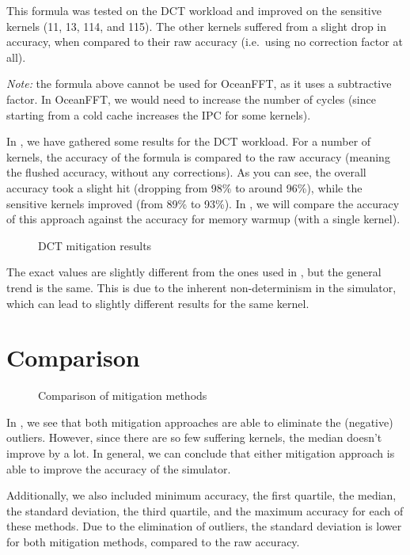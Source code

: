 This formula was tested on the DCT workload and improved on the sensitive kernels (11, 13, 114, and 115).
The other kernels suffered from a slight drop in accuracy, when compared to their raw accuracy (i.e.\ using no correction factor at all).

\textit{Note:} the formula above cannot be used for OceanFFT, as it uses a subtractive factor.
In OceanFFT, we would need to increase the number of cycles (since starting from a cold cache increases the IPC for some kernels).

In , we have gathered some results for the DCT workload.
For a number of kernels, the accuracy of the formula is compared to the raw accuracy (meaning the flushed accuracy, without any corrections).
As you can see, the overall accuracy took a slight hit (dropping from 98\% to around 96\%), while the sensitive kernels improved (from 89\% to 93\%).
In , we will compare the accuracy of this approach against the accuracy for memory warmup (with a single kernel).

\begin{figure}[h]
    \centering
    \caption{DCT mitigation results}
    \label{fig:dct-mitig}
\end{figure}

The exact values are slightly different from the ones used in , but the general trend is the same.
This is due to the inherent non-determinism in the simulator, which can lead to slightly different results for the same kernel.

\FloatBarrier
\section{Comparison}\label{sec:sim-vs-corr}
\begin{figure}[h]
    \centering
    \caption{Comparison of mitigation methods}
    \label{fig:mitig-compare}
\end{figure}

In , we see that both mitigation approaches are able to eliminate the (negative) outliers.
However, since there are so few suffering kernels, the median doesn't improve by a lot.
In general, we can conclude that either mitigation approach is able to improve the accuracy of the simulator.

Additionally, we also included minimum accuracy, the first quartile, the median, the standard deviation, the third quartile, and the maximum accuracy for each of these methods.
Due to the elimination of outliers, the standard deviation is lower for both mitigation methods, compared to the raw accuracy.

